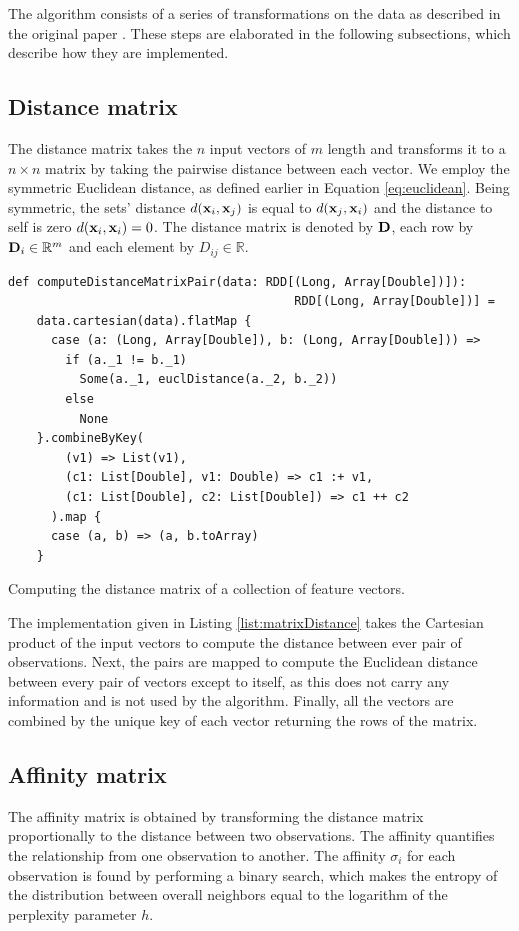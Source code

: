 The algorithm consists of a series of transformations on the data as described in the original paper \cite{MSU:CSE:00:2}. These steps are elaborated in the following subsections, which describe how they are implemented.

\subsection{Distance matrix \label{subsec:distancematrix}}
The distance matrix takes the $n$ input vectors of $m$ length and transforms it to a $n \times n$ matrix by taking the pairwise distance between each vector. We employ the symmetric Euclidean distance, as defined earlier in Equation \ref{eq:euclidean}. Being symmetric, the sets' distance $d({\bf x}_{i},{\bf x}_{j})$ is equal to $d({\bf x}_{j},{\bf x}_{i})$ and the distance to self is zero $d({\bf x}_{i},{\bf x}_{i}) = 0$. The distance matrix is denoted by ${\bf D}$, each row by ${\bf D}_{i} \in \mathbb{R}^{m}$ and each element by $D_{ij} \in \mathbb{R}$.

\begin{listing}[ht!]
\begin{verbatim}
def computeDistanceMatrixPair(data: RDD[(Long, Array[Double])]): 
                                        RDD[(Long, Array[Double])] =
    data.cartesian(data).flatMap {
      case (a: (Long, Array[Double]), b: (Long, Array[Double])) =>
        if (a._1 != b._1)
          Some(a._1, euclDistance(a._2, b._2))
        else
          None
    }.combineByKey(
        (v1) => List(v1),
        (c1: List[Double], v1: Double) => c1 :+ v1,
        (c1: List[Double], c2: List[Double]) => c1 ++ c2
      ).map {
      case (a, b) => (a, b.toArray)
    }
\end{verbatim}

\caption{Computing the distance matrix of a collection of feature vectors.}
\label{list:matrixDistance}
\end{listing}

The implementation given in Listing \ref{list:matrixDistance} takes the Cartesian product of the input vectors to compute the distance between ever pair of observations. Next, the pairs are mapped to compute the Euclidean distance between every pair of vectors except to itself, as this does not carry any information and is not used by the algorithm. Finally, all the vectors are combined by the unique key of each vector returning the rows of the matrix.

\subsection{Affinity matrix \label{subsec:affinity}}
The affinity matrix is obtained by transforming the distance matrix proportionally to the distance between two observations. The affinity quantifies the relationship from one observation to another. The affinity $\sigma_{i}$ for each observation is found by performing a binary search, which makes the entropy of the distribution between overall neighbors equal to the logarithm of the perplexity parameter $h$.


